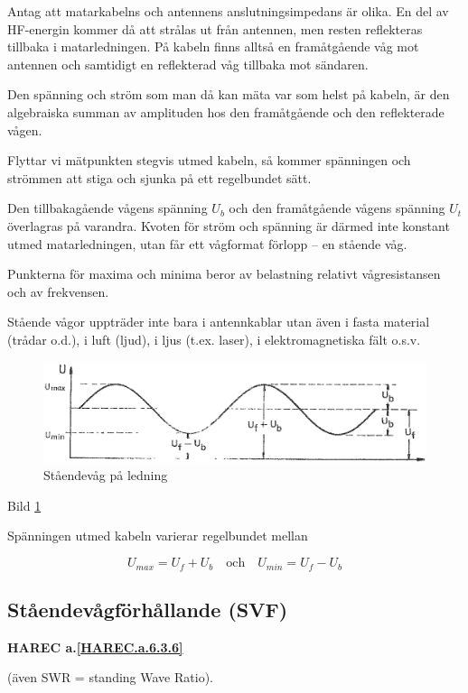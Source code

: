 Antag att matarkabelns och antennens anslutningsimpedans är olika. En
del av HF-energin kommer då att strålas ut från antennen, men resten
reflekteras tillbaka i matarledningen. På kabeln finns alltså en
framåtgående våg mot antennen och samtidigt en reflekterad våg
tillbaka mot sändaren.

Den spänning och ström som man då kan mäta var som helst på kabeln, är
den algebraiska summan av amplituden hos den framåtgående och den
reflekterade vågen.

Flyttar vi mätpunkten stegvis utmed kabeln, så kommer spänningen och
strömmen att stiga och sjunka på ett regelbundet sätt.

Den tillbakagående vågens spänning \(U_b\) och den framåtgående vågens
spänning \(U_t\) överlagras på varandra. Kvoten för ström och spänning
är därmed inte konstant utmed matarledningen, utan får ett vågformat
förlopp -- en stående våg.

Punkterna för maxima och minima beror av belastning relativt
vågresistansen och av frekvensen.

Stående vågor uppträder inte bara i antennkablar utan även i fasta
material (trådar o.d.), i luft (ljud), i ljus (t.ex. laser), i
elektromagnetiska fält o.s.v.

\begin{figure}
  \includegraphics[width=\textwidth]{images/cropped_pdfs/bild_2_6-26.pdf}
  \caption{Ståendevåg på ledning}
  \label{fig:bildII6-26}
\end{figure}

Bild \ref{fig:bildII6-26}

Spänningen utmed kabeln varierar regelbundet mellan

\[U_{max} = U_f + U_b \quad \text{och} \quad U_{min} = U_f - U_b\]

\subsection{Ståendevågförhållande (SVF)}
\textbf{
HAREC a.\ref{HAREC.a.6.3.6}\label{myHAREC.a.6.3.6}
}

(även SWR = standing Wave Ratio).

